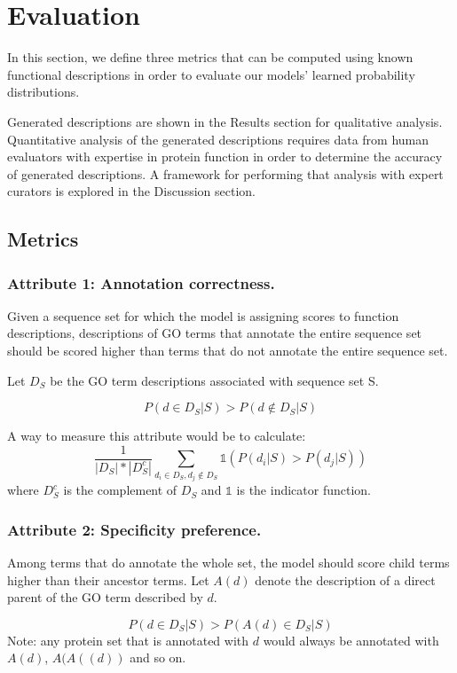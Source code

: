 \documentclass{article}
\begin{document}
\section{Evaluation}
In this section, we define three metrics that can be computed using known functional descriptions in order to evaluate our models' learned probability distributions.

Generated descriptions are shown in the Results section for qualitative analysis.
Quantitative analysis of the generated descriptions requires data from human evaluators with expertise in protein function in order to determine the accuracy of generated descriptions.
A framework for performing that analysis with expert curators is explored in the Discussion section.
    \subsection{Metrics}
        \subsubsection{Attribute 1: Annotation correctness.}

        Given a sequence set for which the model is assigning scores to function descriptions, descriptions of GO terms that annotate the entire sequence set should be scored higher than terms that do not annotate the entire sequence set.

        Let $D_{S}$ be the GO term descriptions associated with sequence set S.

        \[P(d \in D_{S} | S) > P(d \notin D_{S} | S)\]

        A way to measure this attribute would be to calculate:
        \[\frac{1}{|D_{S}|*|D_{S}^{c}|}\sum_{d_i \in D_{S}, d_j \notin D_{S}} \mathds{1}(P(d_i | S) > P(d_j | S))\]
        where $D_{S}^{c}$ is the complement of $D_{S}$ and $\mathds{1}$ is the indicator function.

        \subsubsection{Attribute 2: Specificity preference.}

        Among terms that do annotate the whole set, the model should score child terms higher than their ancestor terms.
Let $A(d)$ denote the description of a direct parent of the GO term described by $d$.

        \[P(d \in D_{S}| S) > P(A(d) \in D_{S}| S)\]
        Note: any protein set that is annotated with $d$ would always be annotated with $A(d)$, $A(A((d))$ and so on.
\end{document}
